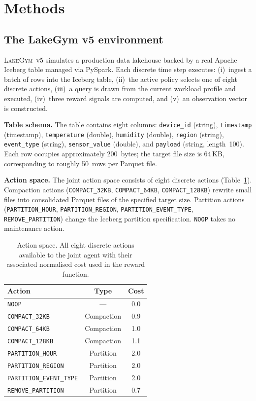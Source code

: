 \documentclass[fleqn,10pt]{wlscirep}
\newcommand{\env}{\textsc{LakeGym~v5}}
\newcommand{\noop}{\texttt{NOOP}}
\newcommand{\cthirtytwo}{\texttt{COMPACT\_32KB}}
\newcommand{\csixtyfour}{\texttt{COMPACT\_64KB}}
\newcommand{\conehundredtwentyeight}{\texttt{COMPACT\_128KB}}
\newcommand{\phour}{\texttt{PARTITION\_HOUR}}
\newcommand{\pregion}{\texttt{PARTITION\_REGION}}
\newcommand{\ptype}{\texttt{PARTITION\_EVENT\_TYPE}}
\newcommand{\removep}{\texttt{REMOVE\_PARTITION}}
\begin{document}
\FloatBarrier

\section*{Methods}
\label{sec:methods}

\subsection*{The LakeGym v5 environment}

\env{} simulates a production data lakehouse backed by a real Apache
Iceberg table managed via PySpark. Each discrete time step executes:
(i)~ingest a batch of rows into the Iceberg table,
(ii)~the active policy selects one of eight discrete actions,
(iii)~a query is drawn from the current workload profile and executed,
(iv)~three reward signals are computed, and
(v)~an observation vector is constructed.

\textbf{Table schema.}
The table contains eight columns: \texttt{device\_id} (string),
\texttt{timestamp} (timestamp), \texttt{temperature} (double),
\texttt{humidity} (double), \texttt{region} (string),
\texttt{event\_type} (string), \texttt{sensor\_value} (double),
and \texttt{payload} (string, length~100). Each row occupies
approximately 200~bytes; the target file size is 64\,KB, corresponding
to roughly 50~rows per Parquet file.

\textbf{Action space.}
The joint action space consists of eight discrete actions
(Table~\ref{tab:actions}). Compaction actions (\cthirtytwo{},
\csixtyfour{}, \conehundredtwentyeight{}) rewrite small files into
consolidated Parquet files of the specified target size. Partition
actions (\phour{}, \pregion{}, \ptype{}, \removep{}) change the Iceberg
partition specification. \noop{} takes no maintenance action.

\begin{table}[!htbp]
\centering
\begin{tabular}{lcc}
\toprule
\textbf{Action} & \textbf{Type} & \textbf{Cost} \\
\midrule
\texttt{NOOP}                   & ---        & 0.0 \\
\texttt{COMPACT\_32KB}          & Compaction & 0.9 \\
\texttt{COMPACT\_64KB}          & Compaction & 1.0 \\
\texttt{COMPACT\_128KB}         & Compaction & 1.1 \\
\texttt{PARTITION\_HOUR}        & Partition  & 2.0 \\
\texttt{PARTITION\_REGION}      & Partition  & 2.0 \\
\texttt{PARTITION\_EVENT\_TYPE} & Partition  & 2.0 \\
\texttt{REMOVE\_PARTITION}      & Partition  & 0.7 \\
\bottomrule
\end{tabular}
\caption{\label{tab:actions}Action space. All eight discrete actions available to the
  joint agent with their associated normalised cost used in the reward
  function.}
\end{table}
\end{document}
